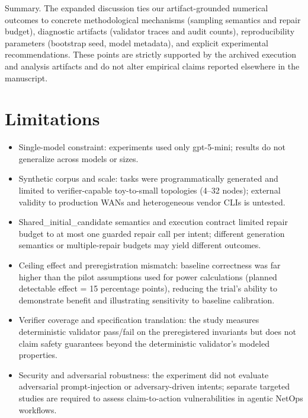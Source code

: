\documentclass[conference]{IEEEtran}
\begin{document}
Summary. The expanded discussion ties our artifact-grounded numerical outcomes to concrete methodological mechanisms (sampling semantics and repair budget), diagnostic artifacts (validator traces and audit counts), reproducibility parameters (bootstrap seed, model metadata), and explicit experimental recommendations. These points are strictly supported by the archived execution and analysis artifacts and do not alter empirical claims reported elsewhere in the manuscript.

\section{Limitations}
\begin{itemize}
\item Single-model constraint: experiments used only gpt-5-mini; results do not generalize across models or sizes.
\item Synthetic corpus and scale: tasks were programmatically generated and limited to verifier-capable toy-to-small topologies (4--32 nodes); external validity to production WANs and heterogeneous vendor CLIs is untested.
\item Shared\_initial\_candidate semantics and execution contract limited repair budget to at most one guarded repair call per intent; different generation semantics or multiple-repair budgets may yield different outcomes.
\item Ceiling effect and preregistration mismatch: baseline correctness was far higher than the pilot assumptions used for power calculations (planned detectable effect = 15 percentage points), reducing the trial's ability to demonstrate benefit and illustrating sensitivity to baseline calibration.
\item Verifier coverage and specification translation: the study measures deterministic validator pass/fail on the preregistered invariants but does not claim safety guarantees beyond the deterministic validator's modeled properties.
\item Security and adversarial robustness: the experiment did not evaluate adversarial prompt-injection or adversary-driven intents; separate targeted studies are required to assess claim-to-action vulnerabilities in agentic NetOps workflows.
\end{itemize}
\end{document}
